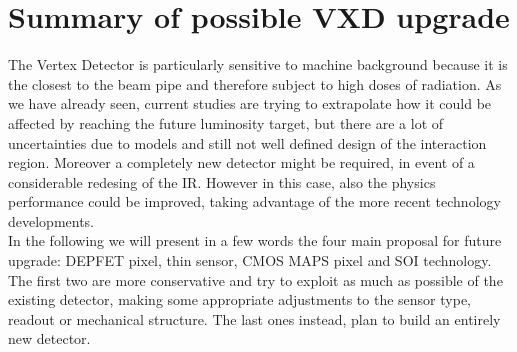 





\section{Summary of possible VXD upgrade}

\begin{comment}
In particular there are three fundamental aspects in physics performance (concern) in regards to VXD and its upgrade:

\begin{itemize}
\itemsep0em
\item Low momentum track finding; 
\item Vertex and IP resolution;
\item Triggers.
\item integration time
\end{itemize}

\end{comment}

The Vertex Detector is particularly sensitive to machine background because it is the closest to the beam pipe and therefore subject to high doses of radiation.
As we have already seen, current studies are trying to extrapolate how it could be affected by reaching the future luminosity target, but there are a lot of uncertainties due to models and still not well defined design of the interaction region. Moreover a completely new detector might be required, in event of a considerable redesing of the IR. However in this case, also the physics performance could be improved, taking advantage of the more recent technology developments.\\

In the following we will present in a few words the four main proposal for future upgrade: DEPFET pixel, thin sensor, CMOS MAPS pixel and SOI technology.
The first two are more conservative and try to exploit as much as possible of the existing detector, making some appropriate adjustments to the sensor type, readout or mechanical structure. The last ones instead, plan to build an entirely new detector.\\

